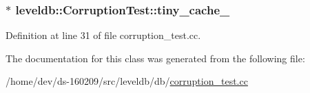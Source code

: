 \subsubsection[{tiny\+\_\+cache\+\_\+}]{$\ast$ leveldb\+::\+Corruption\+Test\+::tiny\+\_\+cache\+\_\+}\label{classleveldb_1_1_corruption_test_afc8ff2f272ee3da2756acc21c37750d5}


Definition at line 31 of file corruption\+\_\+test.\+cc.



The documentation for this class was generated from the following file\+:\begin{DoxyCompactItemize}
\item 
/home/dev/ds-\/160209/src/leveldb/db/\hyperlink{corruption__test_8cc}{corruption\+\_\+test.\+cc}\end{DoxyCompactItemize}
